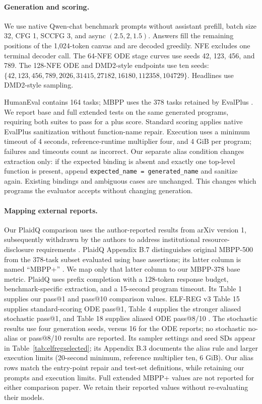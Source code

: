 \documentclass[11pt,letterpaper]{article}
\begin{document}
\paragraph{Generation and scoring.}
We use native Qwen-chat benchmark prompts without assistant prefill, batch size 32, CFG 1, SCCFG 3, and async $(2.5,2,1.5)$. Answers fill the remaining positions of the 1,024-token canvas and are decoded greedily. NFE excludes one terminal decoder call. The 64-NFE ODE stage curves use seeds 42, 123, 456, and 789. The 128-NFE ODE and DMD2-style endpoints use ten seeds: $\{42,123,456,789,2026,31415,27182,16180,112358,104729\}$. Headlines use DMD2-style sampling.

HumanEval \citep{humaneval} contains 164 tasks; MBPP \citep{mbpp} uses the 378 tasks retained by EvalPlus \citep{evalplus}. We report base and full extended tests on the same generated programs, requiring both suites to pass for a plus score. Standard scoring applies native EvalPlus sanitization without function-name repair. Execution uses a minimum timeout of 4 seconds, reference-runtime multiplier four, and 4 GiB per program; failures and timeouts count as incorrect. Our separate alias condition changes extraction only: if the expected binding is absent and exactly one top-level function is present, append \texttt{expected\_name = generated\_name} and sanitize again. Existing bindings and ambiguous cases are unchanged. This changes which programs the evaluator accepts without changing generation.

\paragraph{Mapping external reports.}
Our PlaidQ comparison uses the author-reported results from arXiv version 1, subsequently withdrawn by the authors to address institutional resource-disclosure requirements \citep{plaidq}. PlaidQ Appendix B.7 distinguishes original MBPP-500 from the 378-task subset evaluated using base assertions; its latter column is named ``MBPP+'' \citep{plaidq}. We map only that latter column to our MBPP-378 base metric. PlaidQ uses prefix completion with a 128-token response budget, benchmark-specific extraction, and a 15-second program timeout. Its Table 1 supplies our pass@1 and pass@10 comparison values. ELF-REG v3 Table 15 supplies standard-scoring ODE pass@1, Table 4 supplies the stronger aliased stochastic pass@1, and Table 18 supplies aliased ODE pass@8/10 \citep{scalingdlm}. The stochastic results use four generation seeds, versus 16 for the ODE reports; no stochastic no-alias or pass@8/10 results are reported. Its sampler settings and seed SDs appear in Table~\ref{tab:elfregselected}; its Appendix B.3 documents the alias rule and larger execution limits (20-second minimum, reference multiplier ten, 6 GiB). Our alias rows match the entry-point repair and test-set definitions, while retaining our prompts and execution limits. Full extended MBPP+ values are not reported for either comparison paper. We retain their reported values without re-evaluating their models.
\end{document}
